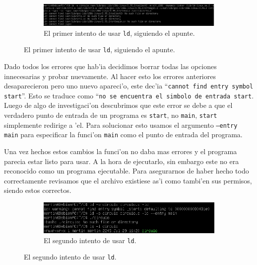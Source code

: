 \documentclass[11pt]{article}
\begin{document}
		\begin{figure}[H]
			\centering
			\begin{subfigure}[b!]{0.7\linewidth}
				\includegraphics[width=\linewidth]{Images/Seccion 1/S1 parte cinco.PNG}
				\caption*{El primer intento de usar \texttt{ld}, siguiendo el apunte.}
			\end{subfigure}
		\end{figure}
		
		Dado todos los errores que hab'ia decidimos borrar todas las opciones innecesarias y probar nuevamente. Al hacer esto los errores anteriores desaparecieron pero uno nuevo apareci'o, este dec'ia ``\texttt{cannot find entry symbol \textunderscore\/start}''. Esto se traduce como ``\texttt{no se encuentra el simbolo de entrada \textunderscore\/start}. Luego de algo de investigaci'on descubrimos que este error se debe a que el verdadero punto de entrada\footnotemark\/ de un programa es \texttt{\textunderscore\/start}, no \texttt{main}, \texttt{\textunderscore\/start} simplemente redirige a 'el. Para solucionar esto usamos el argumento \texttt{--entry main} para especificar la funci'on \texttt{main} como el punto de entrada del programa.
		
		Una vez hechos estos cambios la funci'on no daba mas errores y el programa parecia estar listo para usar. A la hora de ejecutarlo, sin embargo este no era reconocido como un programa ejecutable. Para asegurarnos de haber hecho todo correctamente revisamos que el archivo existiese as'i como tambi'en sus permisos, siendo estos correctos.
		
		
		\begin{figure}[H]
			\centering
			\begin{subfigure}[b!]{0.7\linewidth}
				\includegraphics[width=\linewidth]{Images/Seccion 1/S1 parte seis.PNG}
				\caption*{El segundo intento de usar \texttt{ld}.}
			\end{subfigure}
		\end{figure}
		
\end{document}

